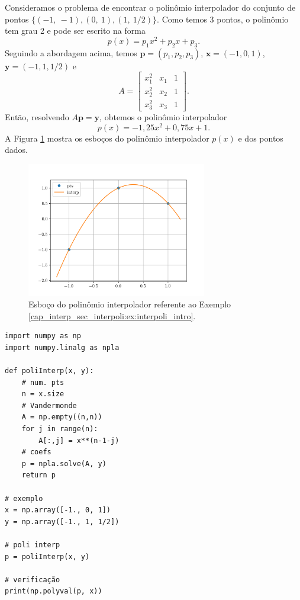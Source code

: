 \begin{ex}\label{cap_interp_sec_interpoli:ex:interpoli_intro}
  Consideramos o problema de encontrar o polinômio interpolador do conjunto de pontos $\{(-1,~-1), (0,~1), (1,~1/2)\}$. Como temos 3 pontos, o polinômio tem grau 2 e pode ser escrito na forma
  \begin{equation}
    p(x) = p_1x^2 + p_2x + p_3.
  \end{equation}
  Seguindo a abordagem acima, temos $\pmb{p}=(p_1, p_2, p_3)$, $\pmb{x} = (-1, 0, 1)$, $\pmb{y}=(-1, 1, 1/2)$ e
  \begin{equation}
    A =
    \begin{bmatrix}
      x_1^2 & x_1 & 1\\
      x_2^2 & x_2 & 1\\
      x_3^2 & x_3 & 1
    \end{bmatrix}.
  \end{equation}
  Então, resolvendo $A\pmb{p} = \pmb{y}$, obtemos o polinômio interpolador
  \begin{equation}
    p(x) = -1,25x^2 + 0,75x + 1.
  \end{equation}
A Figura \ref{cap_interp_sec_interpoli:fig:interpoli_intro} mostra os esboços do polinômio interpolador $p(x)$ e  dos pontos dados.

\begin{figure}[H]
  \centering
  \includegraphics[width=0.7\textwidth]{./cap_interp/dados/fig_poliInterp/fig}
  \caption{Esboço do polinômio interpolador referente ao Exemplo \ref{cap_interp_sec_interpoli:ex:interpoli_intro}.}
  \label{cap_interp_sec_interpoli:fig:interpoli_intro}
\end{figure}

\begin{lstlisting}[caption=poliInterp.py]
import numpy as np
import numpy.linalg as npla

def poliInterp(x, y):
    # num. pts
    n = x.size
    # Vandermonde
    A = np.empty((n,n))
    for j in range(n):
        A[:,j] = x**(n-1-j)
    # coefs
    p = npla.solve(A, y)
    return p

# exemplo
x = np.array([-1., 0, 1])
y = np.array([-1., 1, 1/2])

# poli interp
p = poliInterp(x, y)

# verificação
print(np.polyval(p, x))
\end{lstlisting}
\end{ex}

